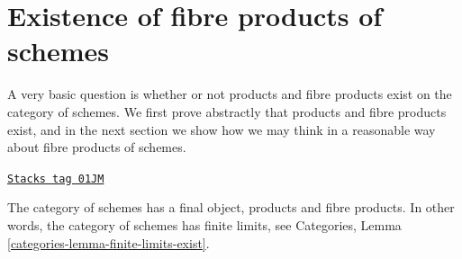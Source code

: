 \section{Existence of fibre products of schemes}
\label{schemes-section-existence-fibre-products}
A very basic question is whether or not products and fibre products
exist on the category of schemes. We first prove abstractly that
products and fibre products exist, and in the next section
we show how we may think in a reasonable way about fibre
products of schemes.

\begin{lemma}
\label{schemes-lemma-fibre-products}
\href{https://stacks.math.columbia.edu/tag/01JM}{\texttt{Stacks tag 01JM}}

The category of schemes has a final object, products and fibre products.
In other words, the category of schemes has finite limits, see
Categories, Lemma \ref{categories-lemma-finite-limits-exist}.
\end{lemma}

